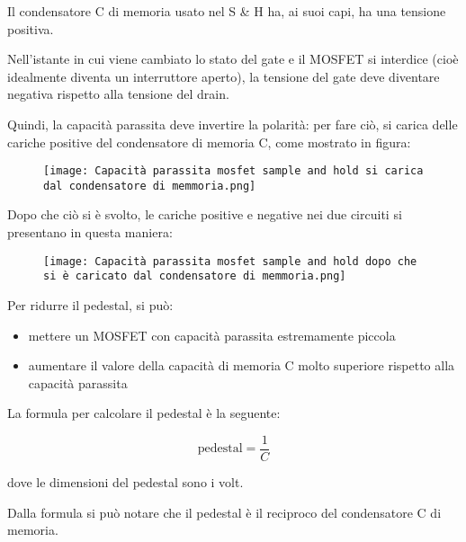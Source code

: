Il condensatore C di memoria usato nel S \& H ha, ai suoi capi, ha una tensione positiva. \newline 

Nell'istante in cui viene cambiato lo stato del gate e il MOSFET si interdice (cioè idealmente diventa un interruttore aperto), 
la tensione del gate deve diventare negativa rispetto alla tensione del drain. \newline 

Quindi, la capacità parassita deve invertire la polarità: per fare ciò, si carica delle cariche positive del condensatore di memoria C, 
come mostrato in figura: 

\begin{figure}[h]
    \centering
    \texttt{[image: Capacità parassita mosfet sample and hold si carica dal condensatore di memmoria.png]}
\end{figure}

Dopo che ciò si è svolto, le cariche positive e negative nei due circuiti si presentano in questa maniera: 

\begin{figure}[h]
    \centering
    \texttt{[image: Capacità parassita mosfet sample and hold dopo che si è caricato dal condensatore di memmoria.png]}
\end{figure}

\newpage

Per ridurre il pedestal, si può: 

\begin{itemize}
    \item mettere un MOSFET con capacità parassita estremamente piccola 
    \item aumentare il valore della capacità di memoria C molto superiore rispetto alla capacità parassita
\end{itemize}

La formula per calcolare il pedestal è la seguente: 

{
    \Large 
    \begin{equation}
        \text{pedestal} = \frac{1}{C}
    \end{equation}
}

dove le dimensioni del pedestal sono i volt. \newline 

Dalla formula si può notare che il pedestal è il reciproco del condensatore C di memoria. \newline 

\newpage 

